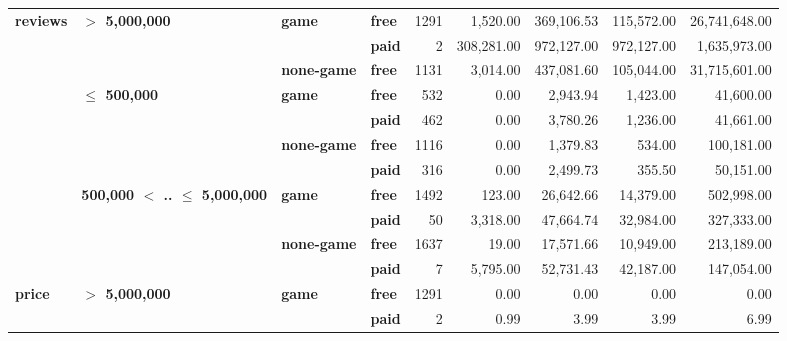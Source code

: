\begin{tabular}{llll|rrrrr}
\cline{1-9}
\cline{2-9}
\cline{3-9}
\multirow{11}{*}{\textbf{reviews}} & \multirow{3}{*}{\textbf{$>$ 5,000,000}} & \multirow{2}{*}{\textbf{game}} & \textbf{free} &   1291 &   1,520.00 & 369,106.53 & 115,572.00 & 26,741,648.00 \\
      &                                 &           & \textbf{paid} &      2 & 308,281.00 & 972,127.00 & 972,127.00 &  1,635,973.00 \\
\cline{3-9}
      &                                 & \textbf{none-game} & \textbf{free} &   1131 &   3,014.00 & 437,081.60 & 105,044.00 & 31,715,601.00 \\
\cline{2-9}
      & \multirow{4}{*}{\textbf{$\leq$ 500,000}} & \multirow{2}{*}{\textbf{game}} & \textbf{free} &    532 &       0.00 &   2,943.94 &   1,423.00 &     41,600.00 \\
      &                                 &           & \textbf{paid} &    462 &       0.00 &   3,780.26 &   1,236.00 &     41,661.00 \\
\cline{3-9}
      &                                 & \multirow{2}{*}{\textbf{none-game}} & \textbf{free} &   1116 &       0.00 &   1,379.83 &     534.00 &    100,181.00 \\
      &                                 &           & \textbf{paid} &    316 &       0.00 &   2,499.73 &     355.50 &     50,151.00 \\
\cline{2-9}
\cline{3-9}
      & \multirow{4}{*}{\textbf{500,000 $<$ .. $\leq$ 5,000,000}} & \multirow{2}{*}{\textbf{game}} & \textbf{free} &   1492 &     123.00 &  26,642.66 &  14,379.00 &    502,998.00 \\
      &                                 &           & \textbf{paid} &     50 &   3,318.00 &  47,664.74 &  32,984.00 &    327,333.00 \\
\cline{3-9}
      &                                 & \multirow{2}{*}{\textbf{none-game}} & \textbf{free} &   1637 &      19.00 &  17,571.66 &  10,949.00 &    213,189.00 \\
      &                                 &           & \textbf{paid} &      7 &   5,795.00 &  52,731.43 &  42,187.00 &    147,054.00 \\
\cline{1-9}
\cline{2-9}
\cline{3-9}
\multirow{11}{*}{\textbf{price}} & \multirow{3}{*}{\textbf{$>$ 5,000,000}} & \multirow{2}{*}{\textbf{game}} & \textbf{free} &   1291 &       0.00 &       0.00 &       0.00 &          0.00 \\
      &                                 &           & \textbf{paid} &      2 &       0.99 &       3.99 &       3.99 &          6.99 \\

\end{tabular}

